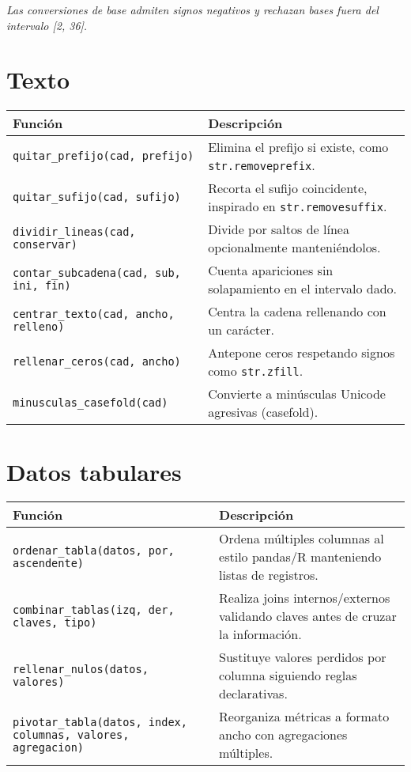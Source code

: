 \documentclass{article}
\begin{document}
\textit{Las conversiones de base admiten signos negativos y rechazan bases fuera del intervalo [2, 36].}

\section*{Texto}
\begin{tabular}{ll}
\textbf{Función} & \textbf{Descripción}\\\hline
\texttt{quitar\_prefijo(cad, prefijo)} & Elimina el prefijo si existe, como \texttt{str.removeprefix}.\\
\texttt{quitar\_sufijo(cad, sufijo)} & Recorta el sufijo coincidente, inspirado en \texttt{str.removesuffix}.\\
\texttt{dividir\_lineas(cad, conservar)} & Divide por saltos de línea opcionalmente manteniéndolos.\\
\texttt{contar\_subcadena(cad, sub, ini, fin)} & Cuenta apariciones sin solapamiento en el intervalo dado.\\
\texttt{centrar\_texto(cad, ancho, relleno)} & Centra la cadena rellenando con un carácter.\\
\texttt{rellenar\_ceros(cad, ancho)} & Antepone ceros respetando signos como \texttt{str.zfill}.\\
\texttt{minusculas\_casefold(cad)} & Convierte a minúsculas Unicode agresivas (casefold).\\
\end{tabular}

\section*{Datos tabulares}
\begin{tabular}{ll}
\textbf{Función} & \textbf{Descripción}\\\hline
\texttt{ordenar\_tabla(datos, por, ascendente)} & Ordena múltiples columnas al estilo pandas/R manteniendo listas de registros.\\
\texttt{combinar\_tablas(izq, der, claves, tipo)} & Realiza joins internos/externos validando claves antes de cruzar la información.\\
\texttt{rellenar\_nulos(datos, valores)} & Sustituye valores perdidos por columna siguiendo reglas declarativas.\\
\texttt{pivotar\_tabla(datos, index, columnas, valores, agregacion)} & Reorganiza métricas a formato ancho con agregaciones múltiples.\\
\end{tabular}
\end{document}
